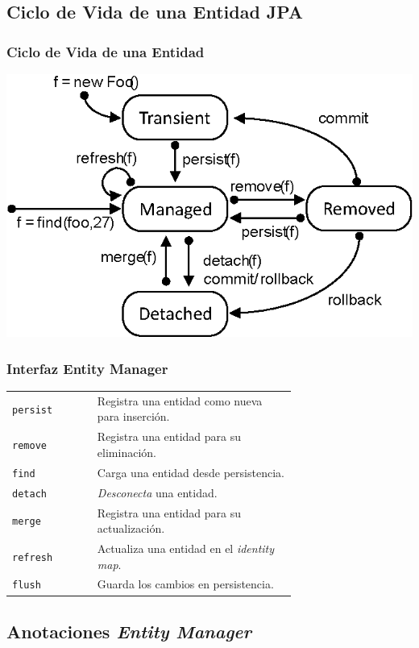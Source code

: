 \documentclass[handout,a4paper,slidestop,xcolor=pst,blue]{beamer}
\begin{document}
\subsection{Ciclo de Vida de una Entidad JPA}

\begin{frame}[c]
    \frametitle{Ciclo de Vida de una Entidad}
    \begin{center}
        \includegraphics[width=0.8\linewidth,keepaspectratio=true]{images/jpa/entityLifecycle.eps}
    \end{center}
\end{frame}

\begin{frame}[c]
    \frametitle{Interfaz Entity Manager}
    \begin{tabular}{lp{0.70\linewidth}}
        \texttt{persist} & Registra una entidad como nueva para inserción.  \\
        \texttt{remove}  & Registra una entidad para su eliminación.        \\
        \texttt{find}    & Carga una entidad desde persistencia.            \\
        \texttt{detach}  & \emph{Desconecta} una entidad.                   \\
        \texttt{merge}   & Registra una entidad para su actualización.      \\
        \texttt{refresh} & Actualiza una entidad en el \emph{identity map}. \\
        \texttt{flush}   & Guarda los cambios en persistencia.              \\
    \end{tabular}
\end{frame}

\subsection{Anotaciones \emph{Entity Manager}}
\end{document}
